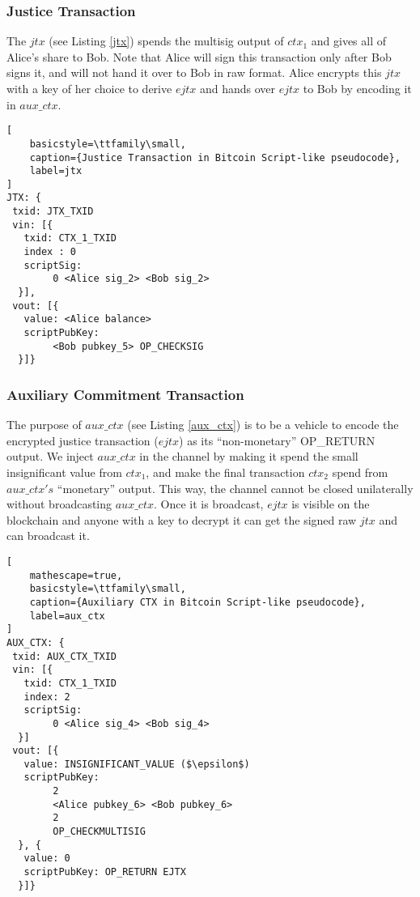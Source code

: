 \subsubsection{Justice Transaction}
The $\mathit{jtx}$ (see Listing \ref{jtx}) spends the multisig output of $\mathit{ctx_1}$ and gives all of Alice's share to Bob. Note that Alice will sign this transaction only after Bob signs it, and will not hand it over to Bob in raw format. Alice encrypts this $\mathit{jtx}$ with a key of her choice to derive $\mathit{ejtx}$ and hands over $\mathit{ejtx}$ to Bob by encoding it in $\mathit{aux\_ctx}$. 

\begin{lstlisting}[
    basicstyle=\ttfamily\small,
    caption={Justice Transaction in Bitcoin Script-like pseudocode},
    label=jtx
]
JTX: {
 txid: JTX_TXID
 vin: [{
   txid: CTX_1_TXID
   index : 0
   scriptSig: 
        0 <Alice sig_2> <Bob sig_2>
  }],
 vout: [{
   value: <Alice balance>
   scriptPubKey: 
        <Bob pubkey_5> OP_CHECKSIG
  }]}
\end{lstlisting}

\subsubsection{Auxiliary Commitment Transaction}
The purpose of $\mathit{aux\_ctx}$ (see Listing \ref{aux_ctx}) is to be a vehicle to encode the encrypted justice transaction ($\mathit{ejtx}$) as its ``non-monetary'' OP\_RETURN output. We inject $\mathit{aux\_ctx}$ in the channel by making it spend the small insignificant value from $\mathit{ctx_1}$, and make the final transaction $\mathit{ctx_2}$ spend from $\mathit{aux\_ctx's}$ ``monetary'' output. This way, the channel cannot be closed unilaterally without broadcasting $\mathit{aux\_ctx}$. Once it is broadcast, $\mathit{ejtx}$ is visible on the blockchain and anyone with a key to decrypt it can get the signed raw $\mathit{jtx}$ and can broadcast it.

\begin{lstlisting}[
    mathescape=true,
    basicstyle=\ttfamily\small,
    caption={Auxiliary CTX in Bitcoin Script-like pseudocode},
    label=aux_ctx
]
AUX_CTX: {
 txid: AUX_CTX_TXID
 vin: [{
   txid: CTX_1_TXID
   index: 2
   scriptSig: 
        0 <Alice sig_4> <Bob sig_4>
  }]
 vout: [{
   value: INSIGNIFICANT_VALUE ($\epsilon$)
   scriptPubKey: 
        2 
        <Alice pubkey_6> <Bob pubkey_6> 
        2 
        OP_CHECKMULTISIG
  }, {
   value: 0
   scriptPubKey: OP_RETURN EJTX
  }]}
\end{lstlisting}

